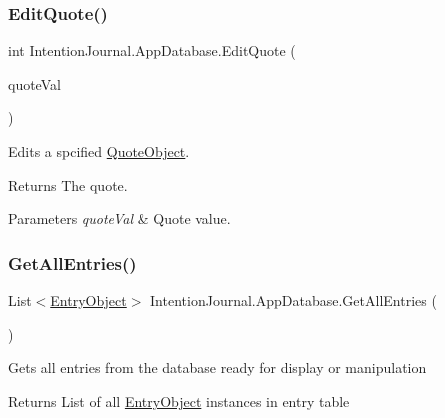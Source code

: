 \subsubsection{\texorpdfstring{Edit\+Quote()}{EditQuote()}}
{\footnotesize\ttfamily int Intention\+Journal.\+App\+Database.\+Edit\+Quote (\begin{DoxyParamCaption}\item[{\hyperlink{class_intention_journal_1_1_quote_object}{Quote\+Object}}]{quote\+Val }\end{DoxyParamCaption})\hspace{0.3cm}{\ttfamily [inline]}}



Edits a spcified \hyperlink{class_intention_journal_1_1_quote_object}{Quote\+Object}. 

\begin{DoxyReturn}{Returns}
The quote.
\end{DoxyReturn}

\begin{DoxyParams}{Parameters}
{\em quote\+Val} & Quote value.\\
\hline
\end{DoxyParams}
\mbox{\label{class_intention_journal_1_1_app_database_a59c3959015247eb6f4ad2265710e82d3}} 
\subsubsection{\texorpdfstring{Get\+All\+Entries()}{GetAllEntries()}}
{\footnotesize\ttfamily List$<$\hyperlink{class_intention_journal_1_1_entry_object}{Entry\+Object}$>$ Intention\+Journal.\+App\+Database.\+Get\+All\+Entries (\begin{DoxyParamCaption}{ }\end{DoxyParamCaption})\hspace{0.3cm}{\ttfamily [inline]}}



Gets all entries from the database ready for display or manipulation 

\begin{DoxyReturn}{Returns}
List of all \hyperlink{class_intention_journal_1_1_entry_object}{Entry\+Object} instances in entry table
\end{DoxyReturn}
\mbox{\label{class_intention_journal_1_1_app_database_a83cdd8b05dd4f11f2e27b03328bd5ef6}} 
